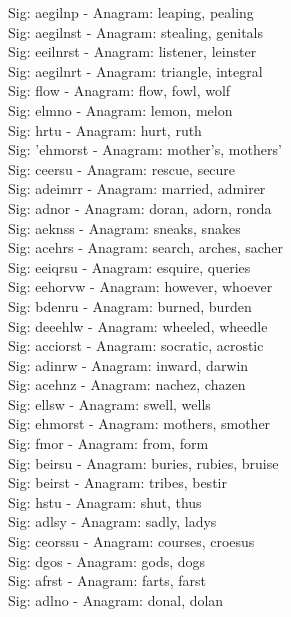 Sig: {aegilnp} - Anagram: leaping, pealing \\
Sig: {aegilnst} - Anagram: stealing, genitals \\
Sig: {eeilnrst} - Anagram: listener, leinster \\
Sig: {aegilnrt} - Anagram: triangle, integral \\
Sig: {flow} - Anagram: flow, fowl, wolf \\
Sig: {elmno} - Anagram: lemon, melon \\
Sig: {hrtu} - Anagram: hurt, ruth \\
Sig: {'ehmorst} - Anagram: mother's, mothers' \\
Sig: {ceersu} - Anagram: rescue, secure \\
Sig: {adeimrr} - Anagram: married, admirer \\
Sig: {adnor} - Anagram: doran, adorn, ronda \\
Sig: {aeknss} - Anagram: sneaks, snakes \\
Sig: {acehrs} - Anagram: search, arches, sacher \\
Sig: {eeiqrsu} - Anagram: esquire, queries \\
Sig: {eehorvw} - Anagram: however, whoever \\
Sig: {bdenru} - Anagram: burned, burden \\
Sig: {deeehlw} - Anagram: wheeled, wheedle \\
Sig: {acciorst} - Anagram: socratic, acrostic \\
Sig: {adinrw} - Anagram: inward, darwin \\
Sig: {acehnz} - Anagram: nachez, chazen \\
Sig: {ellsw} - Anagram: swell, wells \\
Sig: {ehmorst} - Anagram: mothers, smother \\
Sig: {fmor} - Anagram: from, form \\
Sig: {beirsu} - Anagram: buries, rubies, bruise \\
Sig: {beirst} - Anagram: tribes, bestir \\
Sig: {hstu} - Anagram: shut, thus \\
Sig: {adlsy} - Anagram: sadly, ladys \\
Sig: {ceorssu} - Anagram: courses, croesus \\
Sig: {dgos} - Anagram: gods, dogs \\
Sig: {afrst} - Anagram: farts, farst \\
Sig: {adlno} - Anagram: donal, dolan \\

